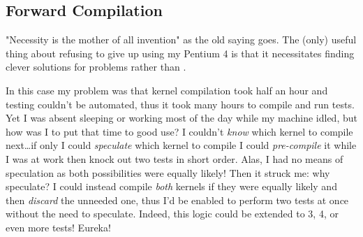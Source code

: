 \documentclass{article}
\begin{document}
\subsection{Forward Compilation}
"Necessity is the mother of all invention" as the old saying goes.  The (only) useful thing about refusing to give up using my Pentium 4 is that it necessitates finding clever solutions for problems rather than .

In this case my problem was that kernel compilation took half an hour and testing couldn't be automated, thus it took many hours to compile and run tests.  Yet I was absent sleeping or working most of the day while my machine idled, but how was I to put that time to good use?  I couldn't \emph{know} which kernel to compile next\ldots if only I could \emph{speculate} which kernel to compile I could \emph{pre-compile} it while I was at work then knock out two tests in short order.  Alas, I had no means of speculation as both possibilities were equally likely!  Then it struck me: why speculate?  I could instead compile \emph{both} kernels if they were equally likely and then \emph{discard} the unneeded one, thus I'd be enabled to perform two tests at once without the need to speculate.  Indeed, this logic could be extended to 3, 4, or even more tests!  Eureka!
\end{document}

